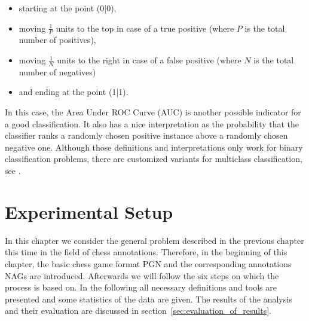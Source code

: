 \documentclass[article,type=msc,colorback,accentcolor=tud7b]{tudthesis}
\begin{document}
    \begin{itemize}[noitemsep]
      \item starting at the point (0|0),
      \item moving $\frac{1}{P}$ units to the top in case of a true positive (where $P$ is the total number of positives),
      \item moving $\frac{1}{N}$ units to the right in case of a false positive (where $N$ is the total number of negatives)
      \item and ending at the point (1|1).
    \end{itemize}
    In this case, the Area Under ROC Curve (AUC) is another possible indicator for a good classification. It also has a nice interpretation as the probability that the classifier ranks a randomly chosen positive instance above a randomly chosen negative one. Although those definitions and interpretations only work for binary classification problems, there are customized variants for multiclass classification, see \autocite{Hand2001}.

  \clearpage
  
  \section{Experimental Setup}
  \label{sec:experimental_setup}
    In this chapter we consider the general problem described in the previous chapter this time in the field of chess annotations. Therefore, in the beginning of this chapter, the basic chess game format PGN and the corresponding annotations NAGs are introduced. Afterwards we will follow the six steps on which the process is based on. In the following all necessary definitions and tools are presented and some statistics of the data are given. The results of the analysis and their evaluation are discussed in section~\ref{sec:evaluation_of_results}.
    
\end{document}
